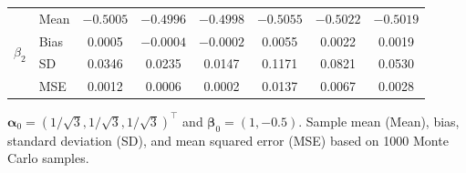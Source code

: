 \begin{table}[H]
\begin{threeparttable}
\begin{tabular}{llcccccc}
\multirow{4}{*}{$\beta_{2}$}
& Mean & $-0.5005$ & $-0.4996$ & $-0.4998$ & $-0.5055$ & $-0.5022$ & $-0.5019$ \\
& Bias & 0.0005 & $-0.0004$ & $-0.0002$ & 0.0055 & 0.0022 & 0.0019 \\
& SD   & 0.0346 & 0.0235 & 0.0147 & 0.1171 & 0.0821 & 0.0530 \\
& MSE  & 0.0012 & 0.0006 & 0.0002 & 0.0137 & 0.0067 & 0.0028 \\

\bottomrule
\end{tabular}
\begin{tablenotes}
\footnotesize
\item $\boldsymbol{\alpha}_0 = (1/\sqrt{3}, 1/\sqrt{3}, 1/\sqrt{3})^\top$ and 
$\boldsymbol{\beta}_0 = (1, -0.5)$. Sample mean (Mean), bias, standard deviation (SD), and mean squared error (MSE) based on 1000 Monte Carlo samples.
\end{tablenotes}
\end{threeparttable}
\end{table}




